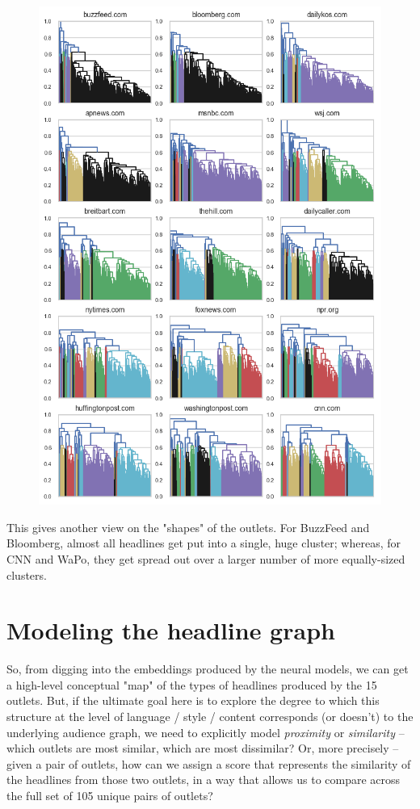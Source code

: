 \documentclass{scrartcl}
\begin{document}
\begin{figure}[H]
  \centering
  \includegraphics[height=0.6\textheight]{figures/cluster-multiples.png}
\end{figure}

This gives another view on the "shapes" of the outlets. For BuzzFeed and Bloomberg, almost all headlines get put into a single, huge cluster; whereas, for CNN and WaPo, they get spread out over a larger number of more equally-sized clusters.


\section{Modeling the headline graph} \label{section:hl-graph}

So, from digging into the embeddings produced by the neural models, we can get a high-level conceptual "map" of the types of headlines produced by the 15 outlets. But, if the ultimate goal here is to explore the degree to which this structure at the level of language / style / content corresponds (or doesn't) to the underlying audience graph, we need to explicitly model \textit{proximity} or \textit{similarity} -- which outlets are most similar, which are most dissimilar? Or, more precisely -- given a pair of outlets, how can we assign a score that represents the similarity of the headlines from those two outlets, in a way that allows us to compare across the full set of 105 unique pairs of outlets?
\end{document}
